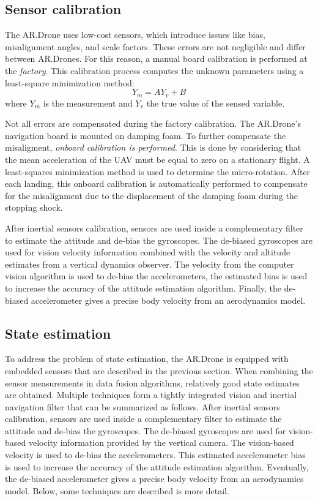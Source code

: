 \subsection{Sensor calibration}
The AR.Drone uses low-cost sensors, which introduce issues like bias, misalignment angles, and scale factors.
These errors are not negligible and differ between AR.Drones.
For this reason, a manual board calibration is performed at the \textit{factory}.
This calibration process computes the unknown parameters using a least-square minimization method:
\begin{equation}
Y_m = AY_v + B
\end{equation}
where $Y_m$ is the measurement and $Y_v$ the true value of the sensed variable.

Not all errors are compensated during the factory calibration.
The AR.Drone's navigation board is mounted on damping foam.
To further compensate the misaligment, \textit{onboard calibration is performed}.
This is done by considering that the mean acceleration of the UAV must be equal to zero on a stationary flight.
A least-squares minimization method is used to determine the micro-rotation.
After each landing, this onboard calibration is automatically performed to compensate for the misalignment due to the displacement of the damping foam during the stopping shock.

After inertial sensors calibration, sensors are used inside a complementary filter to estimate the attitude and de-bias the gyroscopes.
The de-biased gyroscopes are used for vision velocity information combined with the velocity and altitude estimates from a vertical dynamics observer.
The velocity from the computer vision algorithm is used to de-bias the accelerometers, the estimated bias is used to increase the accuracy of the attitude estimation algorithm.
Finally, the de-biased accelerometer gives a precise body velocity from an aerodynamics model.


\subsection{State estimation}
To address the problem of state estimation, the AR.Drone is equipped with embedded sensors that are described in the previous section.
When combining the sensor measurements in data fusion algorithms, relatively good state estimates are obtained.
Multiple techniques form a tightly integrated vision and inertial navigation filter that can be summarized as follows.
After inertial sensors calibration, sensors are used inside a complementary filter to estimate the attitude and de-bias the gyroscopes.
The de-biased gyroscopes are used for vision-based velocity information provided by the vertical camera.
The vision-based velocity is used to de-bias the accelerometers. This estimated accelerometer bias is used to increase the accuracy of the attitude estimation algorithm.
Eventually, the de-biased accelerometer gives a precise body velocity from an aerodynamics model.
Below, some techniques are described is more detail.

